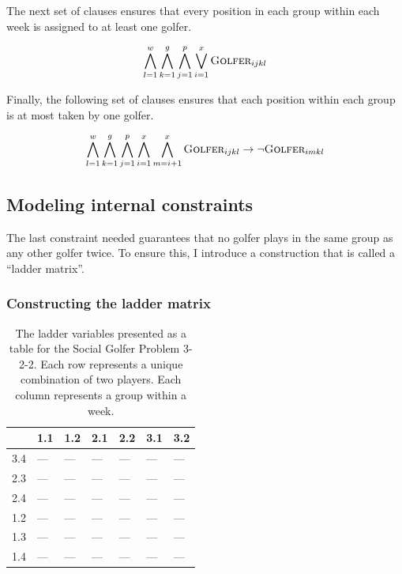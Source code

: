 \documentclass[a4paper]{scrartcl}
\begin{document}
The next set of clauses ensures that every position in each group within each week is assigned to at least one golfer.

\begin{equation}
\centering
    \bigwedge \limits_{l=1}^w 
    \bigwedge \limits_{k=1}^g 
    \bigwedge \limits_{j=1}^p
    \bigvee \limits_{i=1}^x 
    \textsc{Golfer}_{ijkl}
\end{equation}


Finally, the following set of clauses ensures that each position within each group is at most taken by one golfer.

\begin{equation}
\centering
    \bigwedge \limits_{l=1}^w 
    \bigwedge \limits_{k=1}^g 
    \bigwedge \limits_{j=1}^p
    \bigwedge \limits_{i=1}^x 
    \bigwedge \limits_{m=i+1}^x 
    \textsc{Golfer}_{ijkl} 
    \to
    \neg \textsc{Golfer}_{imkl}
\end{equation}


\subsection{Modeling internal constraints}

The last constraint needed guarantees that no golfer plays in the same group as any other golfer twice. To ensure this, I introduce a construction that is called a ``ladder matrix''.


\subsubsection{Constructing the ladder matrix}

\begin{table}[h]
\centering
\label{ladder:example}
\begin{tabular}{ l | l | l | l | l | l | l }

    & 1.1 & 1.2 & 2.1 & 2.2 & 3.1 & 3.2 \\
\hline
3.4 & --- & --- & --- & --- & --- & --- \\
2.3 & --- & --- & --- & --- & --- & --- \\
2.4 & --- & --- & --- & --- & --- & --- \\
1.2 & --- & --- & --- & --- & --- & --- \\
1.3 & --- & --- & --- & --- & --- & --- \\
1.4 & --- & --- & --- & --- & --- & --- \\

\end{tabular}
\caption{The ladder variables presented as a table for the Social Golfer Problem 3-2-2. Each row represents a unique combination of two players. Each column represents a group within a week.}
\end{table}
\end{document}
